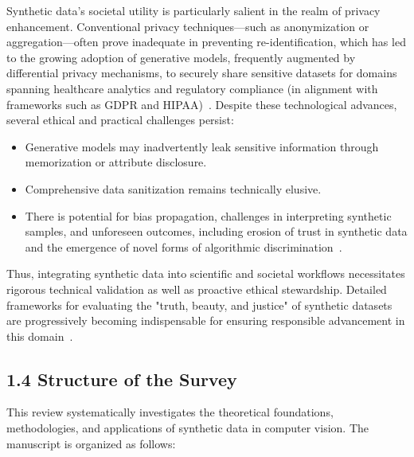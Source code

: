 \documentclass[11pt]{article}
\begin{document}
Synthetic data’s societal utility is particularly salient in the realm of privacy enhancement. Conventional privacy techniques—such as anonymization or aggregation—often prove inadequate in preventing re-identification, which has led to the growing adoption of generative models, frequently augmented by differential privacy mechanisms, to securely share sensitive datasets for domains spanning healthcare analytics and regulatory compliance (in alignment with frameworks such as GDPR and HIPAA)~\cite{ref5,ref6,ref12,ref13}. Despite these technological advances, several ethical and practical challenges persist:

\begin{itemize}
    \item Generative models may inadvertently leak sensitive information through memorization or attribute disclosure.
    \item Comprehensive data sanitization remains technically elusive.
    \item There is potential for bias propagation, challenges in interpreting synthetic samples, and unforeseen outcomes, including erosion of trust in synthetic data and the emergence of novel forms of algorithmic discrimination~\cite{ref12,ref35,ref87}.
\end{itemize}

Thus, integrating synthetic data into scientific and societal workflows necessitates rigorous technical validation as well as proactive ethical stewardship. Detailed frameworks for evaluating the "truth, beauty, and justice" of synthetic datasets are progressively becoming indispensable for ensuring responsible advancement in this domain~\cite{ref14,ref87}.

\subsection{1.4 Structure of the Survey}

This review systematically investigates the theoretical foundations, methodologies, and applications of synthetic data in computer vision. The manuscript is organized as follows:
\end{document}
